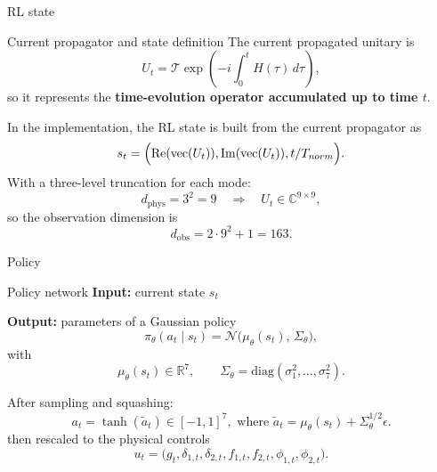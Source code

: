 \documentclass{beamer}
\begin{document}
\begin{frame}{RL state}
\scriptsize

\begin{block}{Current propagator and state definition}
The current propagated unitary is
\[
U_t=\mathcal{T}\exp\!\left(-i\int_0^t H(\tau)\,d\tau\right),
\]
so it represents the \textbf{time-evolution operator accumulated up to time \(t\)}.

\vspace{0.3em}
In the implementation, the RL state is built from the current propagator as
\[
s_t=
\Bigl(
\Re(\mathrm{vec}(U_t)),
\Im(\mathrm{vec}(U_t)),
t/T_{norm}
\Bigr).
\]
With a three-level truncation for each mode:
\[
d_{\mathrm{phys}}=3^2=9
\quad\Longrightarrow\quad
U_t\in\mathbb{C}^{9\times 9},
\]
so the observation dimension is
\[
d_{\mathrm{obs}} = 2\cdot 9^2 + 1 = 163.
\]
\end{block}
\let\thefootnote\relax{}
\end{frame}

\begin{frame}{Policy}
    \begin{block}{Policy network}
    \textbf{Input:} current state \(s_t\)

    \vspace{0.3em}
    \textbf{Output:} parameters of a Gaussian policy
    \[
    \pi_\theta(a_t\mid s_t)
    =\mathcal{N}\!\bigl(\mu_\theta(s_t),\,\Sigma_\theta\bigr),
    \]
    with
    \[
    \mu_\theta(s_t)\in\mathbb{R}^7,
    \qquad
    \Sigma_\theta=\mathrm{diag}(\sigma_1^2,\dots,\sigma_7^2).
    \]

    \vspace{0.3em}
    After sampling and squashing:
    \[
    a_t=\tanh(\tilde a_t)\in[-1,1]^7, \text{ where } \tilde a_t = \mu_\theta(s_t) + \Sigma_\theta^{1/2} \epsilon.
    \]
    then rescaled to the physical controls
    \[
    u_t=
    \bigl(
    g_t,\delta_{1,t},\delta_{2,t},
    f_{1,t},f_{2,t},
    \phi_{1,t},\phi_{2,t}
    \bigr).
    \]
    \end{block}
\let\thefootnote\relax{}
\end{frame}
\end{document}
